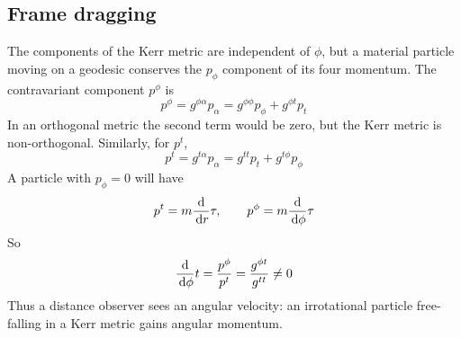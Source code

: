 \subsection{Frame dragging}
\label{sec:frame-dragging}

The components of the Kerr metric are independent of $\phi$, but a
material particle moving on a geodesic conserves the $p_{\phi}$
component of its four momentum. The contravariant component $p^{\phi}$
is
\[ p^{\phi} = g^{\phi \alpha} p_{\alpha} = g^{\phi \phi} p_{\phi} +
g^{\phi t} p_t \] In an orthogonal metric the second term would be
zero, but the Kerr metric is non-orthogonal. Similarly, for $p^t$,
\[ p^t = g^{t\alpha} p_{\alpha} =  g^{tt} p_t + g^{t \phi} p_{\phi} \]
A particle with $p_{\phi}=0$ will have
\[p^t = m \frac{\mathrm{d}}{\,\mathrm{d} r}{\tau}, \qquad p^{\phi} = m \frac{\mathrm{d}}{\,\mathrm{d} \phi}{\tau} \]
So
\[ \frac{\mathrm{d}}{\,\mathrm{d} \phi}{t} = \frac{p^{\phi}}{p^t} = \frac{g^{\phi t}}{g^{tt}}
\neq 0 \] Thus a distance observer sees an angular velocity: an
irrotational particle free-falling in a Kerr metric gains angular
momentum.

